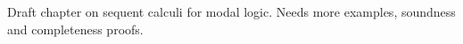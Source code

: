\documentclass[../../../include/open-logic-chapter]{subfiles}
\begin{document}
\begin{editorial}
  Draft chapter on sequent calculi for modal logic. Needs more
  examples, soundness and completeness proofs.
\end{editorial}


\OLEndChapterHook
\end{document}
